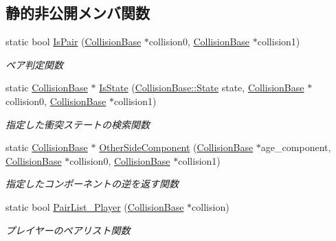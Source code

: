 \subsection*{静的非公開メンバ関数}
\begin{DoxyCompactItemize}
\item 
static bool \mbox{\hyperlink{class_collision_pair_check_a52eefe9e5b104075d4c812ca9b68ff16}{Is\+Pair}} (\mbox{\hyperlink{class_collision_base}{Collision\+Base}} $\ast$collision0, \mbox{\hyperlink{class_collision_base}{Collision\+Base}} $\ast$collision1)
\begin{DoxyCompactList}\small\item\em ペア判定関数 \end{DoxyCompactList}\item 
static \mbox{\hyperlink{class_collision_base}{Collision\+Base}} $\ast$ \mbox{\hyperlink{class_collision_pair_check_ab0f449965867269dc3115e831547a869}{Is\+State}} (\mbox{\hyperlink{class_collision_base_a4dd1ed00099a19c0176913af93c4e365}{Collision\+Base\+::\+State}} state, \mbox{\hyperlink{class_collision_base}{Collision\+Base}} $\ast$collision0, \mbox{\hyperlink{class_collision_base}{Collision\+Base}} $\ast$collision1)
\begin{DoxyCompactList}\small\item\em 指定した衝突ステートの検索関数 \end{DoxyCompactList}\item 
static \mbox{\hyperlink{class_collision_base}{Collision\+Base}} $\ast$ \mbox{\hyperlink{class_collision_pair_check_a97c459f98bce9f88d9f506423395c40c}{Other\+Side\+Component}} (\mbox{\hyperlink{class_collision_base}{Collision\+Base}} $\ast$age\+\_\+component, \mbox{\hyperlink{class_collision_base}{Collision\+Base}} $\ast$collision0, \mbox{\hyperlink{class_collision_base}{Collision\+Base}} $\ast$collision1)
\begin{DoxyCompactList}\small\item\em 指定したコンポーネントの逆を返す関数 \end{DoxyCompactList}\item 
static bool \mbox{\hyperlink{class_collision_pair_check_a9f1819e873a51fcf50a7dbbf5f9d8690}{Pair\+List\+\_\+\+Player}} (\mbox{\hyperlink{class_collision_base}{Collision\+Base}} $\ast$collision)
\begin{DoxyCompactList}\small\item\em プレイヤーのペアリスト関数 \end{DoxyCompactList}\end{DoxyCompactItemize}


